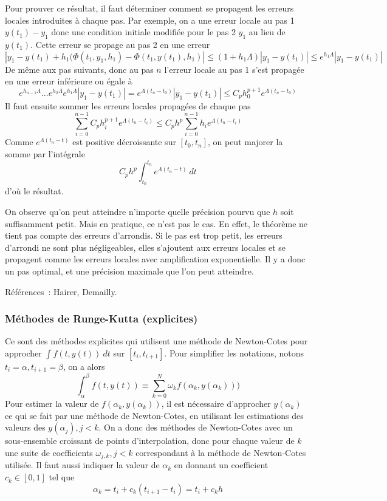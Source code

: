 \documentclass[a4paper,11pt]{article}
\begin{document}
Pour prouver ce r\'esultat, il faut d\'eterminer comment se propagent
les erreurs locales introduites \`a chaque pas.
Par exemple, on a une erreur locale au pas 1 $y(t_1)-y_1$ donc une
condition initiale modifi\'ee pour le pas 2 $y_1$ au lieu de $y(t_1)$.
Cette erreur se propage au pas 2 en une erreur 
$$| y_1-y(t_1)+h_1(\Phi(t_1,y_1,h_1)-\Phi(t_1,y(t_1),h_1)| 
\leq (1+h_1 \Lambda)|y_1-y(t_1)| \leq e^{h_1 \Lambda} |y_1-y(t_1)|$$
De m\^eme aux pas suivants, donc au pas $n$ l'erreur locale au pas 1
s'est propag\'ee en une erreur inf\'erieure ou \'egale \`a~
$$ e^{h_{n-1} \Lambda}... e^{h_2 \Lambda} e^{h_1 \Lambda} |y_1-y(t_1)|
= e^{\Lambda (t_n-t_0)} |y_1-y(t_1)| \leq C_ph_0^{p+1} e^{\Lambda (t_n-t_0)}$$
Il faut ensuite sommer les erreurs locales propag\'ees de chaque pas
$$ \sum_{i=0}^{n-1} C_p h_i^{p+1} e^{\Lambda (t_n-t_i)} 
\leq C_p h^p \sum_{i=0}^{n-1} h_i e^{\Lambda (t_n-t_i)} $$
Comme $e^{\Lambda(t_n-t)}$ est positive d\'ecroissante sur
$[t_0,t_n]$, on peut majorer la somme par l'int\'egrale
$$ C_p h^p \int_{t_0}^{t_n} e^{\Lambda (t_n-t)} \ dt $$
d'o\`u le r\'esultat.

On observe qu'on peut atteindre n'importe quelle pr\'ecision pourvu
que $h$ soit suffisamment petit. Mais en pratique, ce n'est pas le cas.
En effet, le th\'eor\`eme ne tient pas compte des erreurs d'arrondis.
Si le pas est trop petit, les erreurs d'arrondi ne sont plus n\'egligeables,
elles s'ajoutent aux erreurs locales et se propagent comme les erreurs
locales avec amplification exponentielle.
Il y a donc un pas optimal, et une pr\'ecision maximale que l'on peut
atteindre.

R\'ef\'erences~: Hairer, Demailly.

\subsubsection{Méthodes de Runge-Kutta (explicites)}
Ce sont des méthodes explicites qui 
utilisent une méthode de Newton-Cotes pour approcher
$\int f(t,y(t)) \ dt$ sur $[t_i,t_{i+1}]$.
Pour simplifier les notations, notons $t_i=\alpha, t_{i+1}=\beta$,
on a alors
$$ \int_{\alpha}^{\beta} f(t,y(t)) 
\equiv \sum_{k=0}^N \omega_k f(\alpha_k,y(\alpha_k)))$$
Pour estimer la valeur de $f(\alpha_k,y(\alpha_k))$, il est nécessaire
d'approcher $y(\alpha_k)$ ce qui se fait par une méthode
de Newton-Cotes, en utilisant les estimations des
valeurs des $y(\alpha_j), j<k$. On a 
donc des méthodes de Newton-Cotes avec un sous-ensemble croissant
de points d'interpolation, donc pour chaque valeur de $k$ une
suite de coefficients $\omega_{j,k}, j<k$ correspondant \`a la
m\'ethode de Newton-Cotes utilis\'ee. Il faut aussi indiquer la valeur de
$\alpha_k$ en donnant un coefficient $c_k \in [0,1]$ tel que
$$ \alpha_k = t_i + c_k (t_{i+1}-t_i) = t_i+c_k h$$
\end{document}
